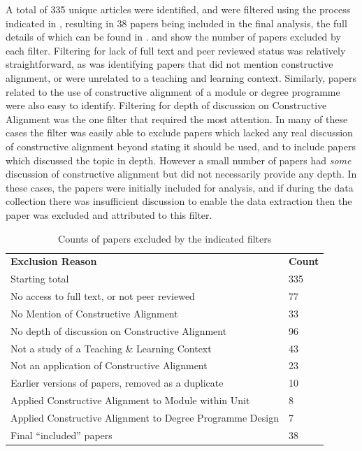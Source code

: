 A total of 335 unique articles were identified, and were filtered using the process indicated in , resulting in 38 papers being included in the final analysis, the full details of which can be found in .  and  show the number of papers excluded by each filter. Filtering for lack of full text and peer reviewed status was relatively straightforward, as was identifying papers that did not mention constructive alignment, or were unrelated to a teaching and learning context. Similarly, papers related to the use of constructive alignment of a module or degree programme were also easy to identify. Filtering for depth of discussion on Constructive Alignment was the one filter that required the most attention. In many of these cases the filter was easily able to exclude papers which lacked any real discussion of constructive alignment beyond stating it should be used, and to include papers which discussed the topic in depth. However a small number of papers had \emph{some} discussion of constructive alignment but did not necessarily provide any depth. In these cases, the papers were initially included for analysis, and if during the data collection there was insufficient discussion to enable the data extraction then the paper was excluded and attributed to this filter.

\begin{table}[p]
	\centering
	\caption{Counts of papers excluded by the indicated filters}
	\label{tbl:exclude_reason}
	\footnotesize
    \begin{tabular}{l|l}
    \textbf{Exclusion Reason} & \textbf{Count} \\
    Starting total & 335 \\
    \hline
    No access to full text, or not peer reviewed & 77 \\
    No Mention of Constructive Alignment & 33 \\
    No depth of discussion on Constructive Alignment & 96 \\
    Not a study of a Teaching \& Learning Context & 43 \\
    Not an application of Constructive Alignment & 23 \\
    Earlier versions of papers, removed as a duplicate & 10 \\
    Applied Constructive Alignment to Module within Unit & 8 \\
    Applied Constructive Alignment to Degree Programme Design & 7 \\ \hline
    Final ``included'' papers & 38 \\
    \end{tabular}
\end{table}

